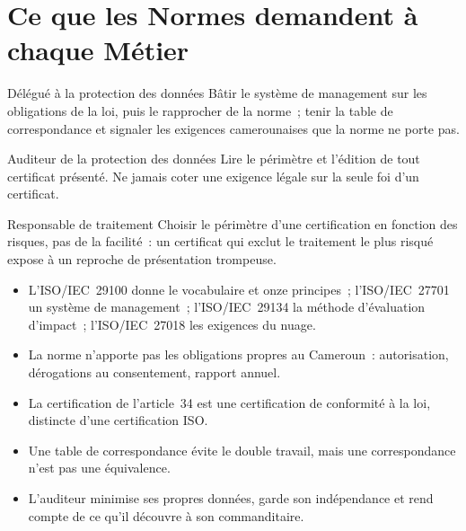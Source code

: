 \section{Ce que les Normes demandent à chaque Métier}
\label{sec:c09-metiers}

\begin{boxmetier}{Délégué à la protection des données}
Bâtir le système de management sur les obligations de la loi, puis le
rapprocher de la norme~; tenir la table de correspondance et signaler les
exigences camerounaises que la norme ne porte pas.
\end{boxmetier}

\begin{boxmetier}{Auditeur de la protection des données}
Lire le périmètre et l'édition de tout certificat présenté. Ne jamais coter
\OUI{} une exigence légale sur la seule foi d'un certificat.
\end{boxmetier}

\begin{boxmetier}{Responsable de traitement}
Choisir le périmètre d'une certification en fonction des risques, pas de la
facilité~: un certificat qui exclut le traitement le plus risqué expose à un
reproche de présentation trompeuse.
\end{boxmetier}

\begin{boxresume}
\begin{itemize}
    \item L'ISO/IEC~29100 donne le vocabulaire et onze principes~;
          l'ISO/IEC~27701 un système de management~; l'ISO/IEC~29134 la
          méthode d'évaluation d'impact~; l'ISO/IEC~27018 les exigences du
          nuage.
    \item La norme n'apporte pas les obligations propres au Cameroun~:
          autorisation, dérogations au consentement, rapport annuel.
    \item La certification de l'article~34 est une certification de
          conformité à la loi, distincte d'une certification ISO.
    \item Une table de correspondance évite le double travail, mais une
          correspondance n'est pas une équivalence.
    \item L'auditeur minimise ses propres données, garde son indépendance et
          rend compte de ce qu'il découvre à son commanditaire.
\end{itemize}
\end{boxresume}

